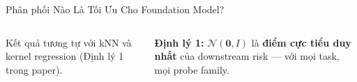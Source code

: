 \documentclass[aspectratio=169,9pt]{beamer}
\begin{document}
\begin{frame}{Phân phối Nào Là Tối Ưu Cho Foundation Model?}
\begin{columns}[T]
\vspace{0.45em}
Kết quả tương tự với kNN và kernel regression (Định lý 1 trong paper).

\vspace{0.5em}
\begin{accentbox}
\footnotesize \textbf{Định lý 1:} $\mathcal{N}(\mathbf{0}, I)$ là \textbf{điểm cực tiểu duy nhất} của downstream risk — với mọi task, mọi probe family.
\end{accentbox}

\end{columns}

\end{frame}
\fi %


\end{document}

